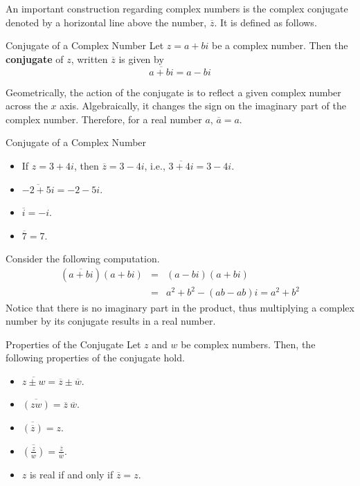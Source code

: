 An important construction regarding complex numbers is the complex
conjugate
denoted by a horizontal line above the number, $\overline{z}$. It
is defined as follows.

\begin{definition}{Conjugate of a Complex Number}\label{def:conjugate}
Let $z = a+bi$ be a complex number. Then the \textbf{conjugate} of $z$, written $\overline{z}$ is given by 
\begin{equation*}
\overline{a+bi}= a-bi
\end{equation*}
\end{definition}

Geometrically, the action of the conjugate is to reflect a given complex number across the $x$ axis.
Algebraically, it changes the sign on the imaginary part of the complex number. Therefore, for a real number $a$, $\overline{a} = a$. 

\begin{example}{Conjugate of a Complex Number}\label{exa:complexconjugate}
\begin{itemize}

\item If $z=3+4i$, then $\overline{z}=3-4i$,
i.e., $\overline{3+4i}=3-4i$.

\item $\overline{-2+5i}= -2-5i$.

\item $\overline{i}= -i$.

\item $\overline{7}= 7$.
\end{itemize}
\end{example}

Consider the following computation. 
\begin{eqnarray*}
\left( \overline{a+bi}\right) \left( a+bi\right) &=&\left( a-bi\right)
\left( a+bi\right) \\
&=&a^{2}+b^{2}-\left( ab-ab\right)i =a^{2}+b^{2}
\end{eqnarray*}
Notice that there is no imaginary part in the product, thus
multiplying a complex number by its conjugate results in  a real number.

\begin{theorem}{Properties of the Conjugate}\label{thm:propertiesconjugate}
Let $z$ and $w$ be complex numbers. Then, the following properties of the conjugate hold.

\begin{itemize}
\item
$\overline{z\pm w} = \overline{z} \pm \overline{w}$.
\item
$\overline{(zw)} = \overline{z}~ \overline{w}$.
\item
$\overline{(\overline{z})}=z$.
\item
$\overline{\left(\frac{z}{w}\right)} =
\frac{\overline{z}}{\overline{w}}$.
\item
$z$ is real if and only if $\overline{z}=z$.
\end{itemize}
\end{theorem}


